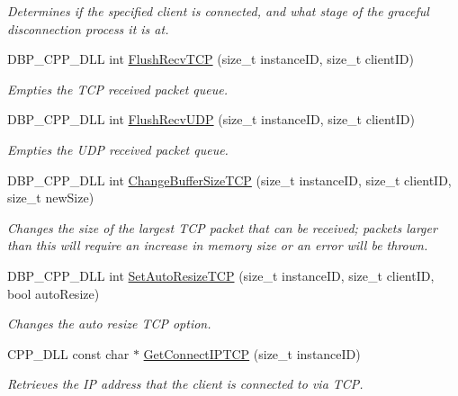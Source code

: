 \begin{DoxyCompactItemize}
\begin{DoxyCompactList}\small\item\em Determines if the specified client is connected, and what stage of the graceful disconnection process it is at. \item\end{DoxyCompactList}\item 
DBP\_\-CPP\_\-DLL int \hyperlink{namespacemn_a4dc2d3891cf1703bf452b5e2aa478f2e}{FlushRecvTCP} (size\_\-t instanceID, size\_\-t clientID)
\begin{DoxyCompactList}\small\item\em Empties the TCP received packet queue. \item\end{DoxyCompactList}\item 
DBP\_\-CPP\_\-DLL int \hyperlink{namespacemn_a9e9638697d08de4e65a85864cc4524aa}{FlushRecvUDP} (size\_\-t instanceID, size\_\-t clientID)
\begin{DoxyCompactList}\small\item\em Empties the UDP received packet queue. \item\end{DoxyCompactList}\item 
DBP\_\-CPP\_\-DLL int \hyperlink{namespacemn_ab9b1a02847005a257c1c08e96558c162}{ChangeBufferSizeTCP} (size\_\-t instanceID, size\_\-t clientID, size\_\-t newSize)
\begin{DoxyCompactList}\small\item\em Changes the size of the largest TCP packet that can be received; packets larger than this will require an increase in memory size or an error will be thrown. \item\end{DoxyCompactList}\item 
DBP\_\-CPP\_\-DLL int \hyperlink{namespacemn_aaba22ec864ee20e4c2811bb2ad2ec3bf}{SetAutoResizeTCP} (size\_\-t instanceID, size\_\-t clientID, bool autoResize)
\begin{DoxyCompactList}\small\item\em Changes the auto resize TCP option. \item\end{DoxyCompactList}\item 
CPP\_\-DLL const char $\ast$ \hyperlink{namespacemn_a4cbae8de856869fefcf8c36ade5fca5a}{GetConnectIPTCP} (size\_\-t instanceID)
\begin{DoxyCompactList}\small\item\em Retrieves the IP address that the client is connected to via TCP. \item\end{DoxyCompactList}\item 

\end{DoxyCompactItemize}
